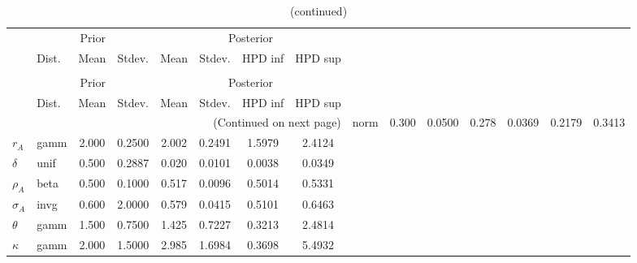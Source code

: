  
\begin{center}
\begin{longtable}{llcccccc} 
\caption{Results from Metropolis-Hastings (parameters)}
 \label{Table:MHPosterior:1}\\
\toprule 
  & \multicolumn{3}{c}{Prior}  &  \multicolumn{4}{c}{Posterior} \\
  \cmidrule(r{.75em}){2-4} \cmidrule(r{.75em}){5-8}
  & Dist. & Mean  & Stdev. & Mean & Stdev. & HPD inf & HPD sup\\
\midrule \endfirsthead 
\caption{(continued)}\\\toprule 
  & \multicolumn{3}{c}{Prior}  &  \multicolumn{4}{c}{Posterior} \\
  \cmidrule(r{.75em}){2-4} \cmidrule(r{.75em}){5-8}
  & Dist. & Mean  & Stdev. & Mean & Stdev. & HPD inf & HPD sup\\
\midrule \endhead 
\bottomrule \multicolumn{8}{r}{(Continued on next page)} \endfoot 
\bottomrule \endlastfoot 
${\alpha}$ & norm &   0.300 & 0.0500 &   0.278& 0.0369 &  0.2179 &  0.3413 \\ 
${r_{A}}$ & gamm &   2.000 & 0.2500 &   2.002& 0.2491 &  1.5979 &  2.4124 \\ 
${\delta}$ & unif &   0.500 & 0.2887 &   0.020& 0.0101 &  0.0038 &  0.0349 \\ 
${\rho_A}$ & beta &   0.500 & 0.1000 &   0.517& 0.0096 &  0.5014 &  0.5331 \\ 
${\sigma_A}$ & invg &   0.600 & 2.0000 &   0.579& 0.0415 &  0.5101 &  0.6463 \\ 
${\theta}$ & gamm &   1.500 & 0.7500 &   1.425& 0.7227 &  0.3213 &  2.4814 \\ 
${\kappa}$ & gamm &   2.000 & 1.5000 &   2.985& 1.6984 &  0.3698 &  5.4932 \\ 
\end{longtable}
 \end{center}

